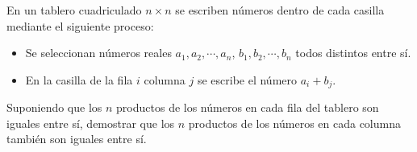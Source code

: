 \begin{section-problem}
    En un tablero cuadriculado $n \times n$ se escriben números dentro de cada casilla mediante el siguiente proceso:
    \begin{itemize}
        \item Se seleccionan números reales $a_1, a_2, \cdots, a_n$, $b_1, b_2, \cdots, b_n$ todos distintos entre sí.
        \item En la casilla de la fila $i$ columna $j$ se escribe el número $a_i + b_j$.
    \end{itemize}
    Suponiendo que los $n$ productos de los números en cada fila del tablero son iguales entre sí, demostrar que los $n$ productos de los números en cada columna también son iguales entre sí.
\end{section-problem}

